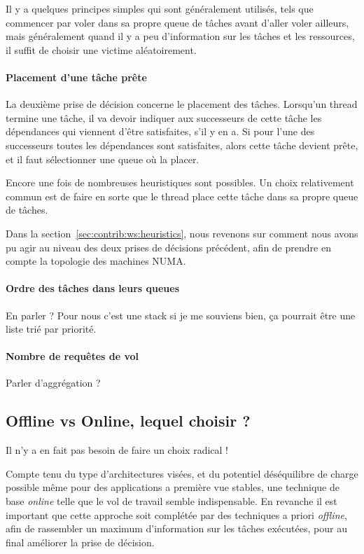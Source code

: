 Il y a quelques principes simples qui sont généralement utilisés, tels que commencer par voler dans sa propre queue de tâches avant d'aller voler ailleurs, mais généralement quand il y a peu d'information sur les tâches et les ressources, il suffit de choisir une victime aléatoirement.

\paragraph{Placement d'une tâche prête}

La deuxième prise de décision concerne le placement des tâches.
Lorsqu'un thread termine une tâche, il va devoir indiquer aux successeurs de cette tâche les dépendances qui viennent d'être satisfaites, s'il y en a.
Si pour l'une des successeurs toutes les dépendances sont satisfaites, alors cette tâche devient prête, et il faut sélectionner une queue où la placer.

Encore une fois de nombreuses heuristiques sont possibles. Un choix relativement commun est de faire en sorte que le thread place cette tâche dans sa propre queue de tâches.


Dans la section~\ref{sec:contrib:ws:heuristics}, nous revenons sur comment nous avons pu agir au niveau des deux prises de décisions précédent, afin de prendre en compte la topologie des machines NUMA.

\paragraph{Ordre des tâches dans leurs queues}

En parler ?
Pour nous c'est une stack si je me souviens bien, ça pourrait être une liste trié par priorité.

\paragraph{Nombre de requêtes de vol}

Parler d'aggrégation ?


\subsection{Offline vs Online, lequel choisir ?}

Il n'y a en fait pas besoin de faire un choix radical !

Compte tenu du type d'architectures visées, et du potentiel déséquilibre de charge possible même pour des applications a première vue stables, une technique de base \emph{online} telle que le vol de travail semble indispensable.
En revanche il est important que cette approche soit complétée par des techniques a priori \emph{offline}, afin de rassembler un maximum d'information sur les tâches exécutées, pour au final améliorer la prise de décision.




